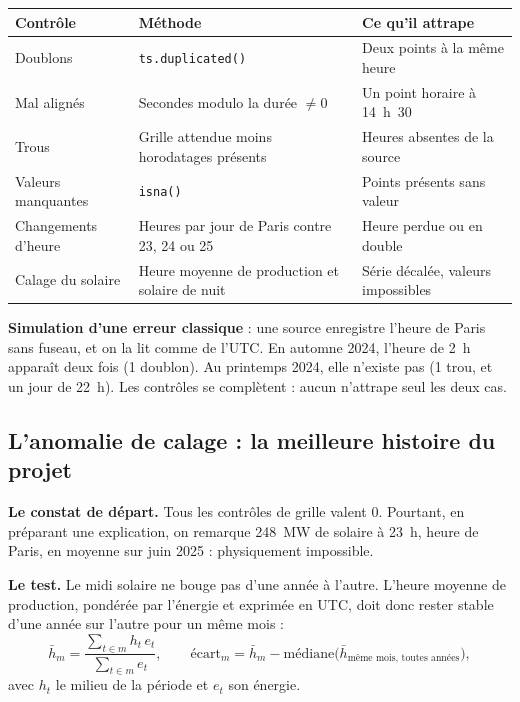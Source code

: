 \documentclass[11pt,a4paper]{article}
\newcommand{\code}[1]{\texttt{\small #1}}
\begin{document}
\begin{center}
\begin{tabularx}{\linewidth}{lYY}
\toprule
\textbf{Contrôle} & \textbf{Méthode} & \textbf{Ce qu'il attrape} \\
\midrule
Doublons & \code{ts.duplicated()} & Deux points à la même heure \\
Mal alignés & Secondes modulo la durée $\neq 0$ & Un point horaire à 14~h~30 \\
Trous & Grille attendue moins horodatages présents & Heures absentes de la source \\
Valeurs manquantes & \code{isna()} & Points présents sans valeur \\
Changements d'heure & Heures par jour de Paris contre 23, 24 ou 25 & Heure perdue ou en double \\
Calage du solaire & Heure moyenne de production et solaire de nuit & Série décalée, valeurs impossibles \\
\bottomrule
\end{tabularx}
\end{center}

\textbf{Simulation d'une erreur classique} : une source enregistre l'heure de Paris sans fuseau, et on la lit comme de l'UTC.
En automne 2024, l'heure de 2~h apparaît deux fois (1 doublon). Au printemps 2024, elle n'existe pas (1 trou, et un jour de 22~h).
Les contrôles se complètent : aucun n'attrape seul les deux cas.

\subsection{L'anomalie de calage : la meilleure histoire du projet}
\label{sec:calage}

\textbf{Le constat de départ.} Tous les contrôles de grille valent 0. Pourtant, en préparant une explication, on remarque 248~MW de solaire à
23~h, heure de Paris, en moyenne sur juin 2025 : physiquement impossible.

\textbf{Le test.} Le midi solaire ne bouge pas d'une année à l'autre. L'heure moyenne de production, pondérée par l'énergie et exprimée en UTC, doit
donc rester stable d'une année sur l'autre pour un même mois :
\[
\bar h_m = \frac{\sum_{t \in m} h_t\, e_t}{\sum_{t \in m} e_t},
\qquad
\text{écart}_m = \bar h_m - \text{médiane}\big(\bar h_{\text{même mois, toutes années}}\big),
\]
avec $h_t$ le milieu de la période et $e_t$ son énergie.
\end{document}
